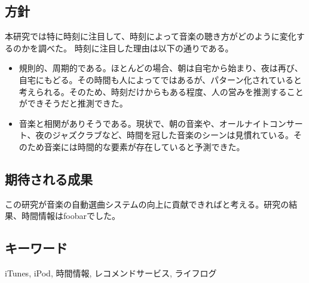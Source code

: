 \documentclass{jsarticle}
\begin{document}
\subsection{方針}
本研究では特に時刻に注目して、時刻によって音楽の聴き方がどのように変化するのかを調べた。
時刻に注目した理由は以下の通りである。
\begin{itemize}
\item
規則的、周期的である。ほとんどの場合、朝は自宅から始まり、夜は再び、自宅にもどる。その時間も人によってではあるが、パターン化されていると考えられる。そのため、時刻だけからもある程度、人の営みを推測することができそうだと推測できた。
\item
音楽と相関がありそうである。現状で、朝の音楽や、オールナイトコンサート、夜のジャズクラブなど、時間を冠した音楽のシーンは見慣れている。そのため音楽には時間的な要素が存在していると予測できた。
\end{itemize}

\subsection{期待される成果}
この研究が音楽の自動選曲システムの向上に貢献できればと考える。研究の結果、時間情報はfoobarでした。
\subsection{キーワード}
iTunes, iPod, 時間情報, レコメンドサービス, ライフログ
\end{document}

